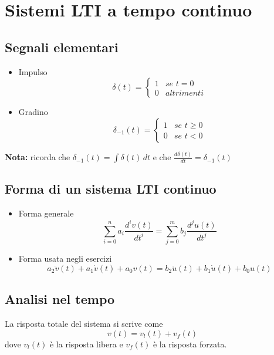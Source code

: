\documentclass[a4paper,oneside,titlepage]{book}
\begin{document}
\begin{frontespizio}
\end{frontespizio}

\frontmatter
\tableofcontents

\mainmatter
\chapter{Sistemi LTI a tempo continuo}

\section{Segnali elementari}
\begin{itemize}
\item Impulso
\[ \delta (t) = \begin{cases}
1 & se \,\, t = 0 \\
0 & altrimenti
\end{cases} \]

\item Gradino
\[ \delta_{-1} (t) = \begin{cases}
1 & se \,\, t \geq 0 \\
0 & se \,\, t < 0
\end{cases} \]
\end{itemize}

\textbf{Nota:}
ricorda che $\delta_{-1} (t) = \int \delta(t)\,dt$ e che $\frac{d \delta(t)}{dt} = \delta_{-1}(t)$


\section{Forma di un sistema LTI continuo}
\begin{itemize}
\item Forma generale
\[ \sum_{i=0}^n a_i \frac{d^{i} v(t)}{dt^{i}} = \sum_{j=0}^m b_j \frac{d^{j} u(t)}{dt^{j}} \]

\item Forma usata negli esercizi
\[ a_2 \ddot{v}(t) + a_1 \dot{v}(t) + a_0 v(t) = b_2 \ddot{u}(t) + b_1 \dot{u}(t) + b_0 u(t) \]
\end{itemize}


\section{Analisi nel tempo}
La risposta totale del sistema si scrive come
\[ v(t) = v_l(t) + v_f(t) \]
dove $v_l(t)$ è la risposta libera e $v_f(t)$ è la risposta forzata.
\end{document}
